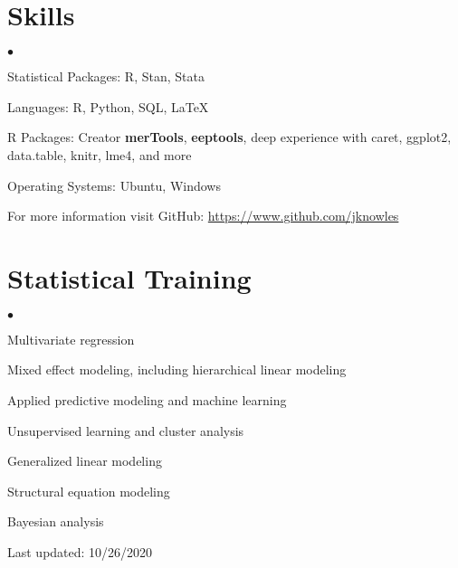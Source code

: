 \documentclass[margin,line]{res}
\newenvironment{list2}{
  \begin{list}{$\bullet$}{%
      \setlength{\itemsep}{0in}
      \setlength{\parsep}{0in} \setlength{\parskip}{0in}
      \setlength{\topsep}{0in} \setlength{\partopsep}{0in} 
      \setlength{\leftmargin}{0.2in}}}{\end{list}}
\begin{document}
\begin{resume}


% 


\section{\sc Skills} 
\begin{list2}
\item Statistical Packages:  R, Stan, Stata
\item Languages:  R, Python, SQL, \LaTeX
\item R Packages: Creator \textbf{merTools}, \textbf{eeptools}, deep experience with caret, ggplot2, data.table, knitr, lme4, and more
\item Operating Systems:  Ubuntu, Windows
\item For more information visit GitHub: \url{https://www.github.com/jknowles}\\
\end{list2}

\section{\sc Statistical Training}
\begin{list2}
\item Multivariate regression
\item Mixed effect modeling, including hierarchical linear modeling
\item Applied predictive modeling and machine learning
\item Unsupervised learning and cluster analysis
\item Generalized linear modeling
\item Structural equation modeling
\item Bayesian analysis
\end{list2}

% 

Last updated: 10/26/2020

\end{resume}
\end{document}
